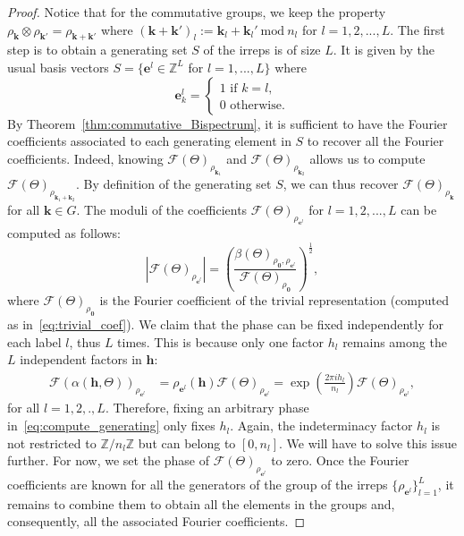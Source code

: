 \documentclass{article}
\theoremstyle{plain}
\theoremstyle{definition}
\theoremstyle{remark}
\newcommand{\kbf}{\mathbf{k}}
\newcommand{\ebf}{\mathbf{e}}
\begin{document}
\begin{proof}
Notice that for the commutative groups, we keep the property $\rho_{\kbf}\otimes\rho_{\kbf'}=\rho_{\kbf+\kbf'}$ where $(\kbf+\kbf')_l := \kbf_l+\kbf_l'\ \mathrm{mod} \ n_l$ for $l=1,2,...,L$. The first step is to obtain a generating set $S$ of the irreps is of size $L$. It is given by the usual basis vectors $S=\{\ebf^l\in \mathbb{Z}^L$ for $l=1,...,L\}$ where
\begin{equation*}
    \ebf^l_k=\begin{cases}
        1 \text{ if } k=l,\\
        0 \text{ otherwise.}
    \end{cases}
\end{equation*}
By Theorem~\ref{thm:commutative_Bispectrum}, it is sufficient to have the Fourier coefficients associated to each generating element in $S$ to recover all the Fourier coefficients. Indeed, knowing $\mathcal{F}(\Theta)_{\rho_{\kbf_1}}$ and $\mathcal{F}(\Theta)_{\rho_{\kbf_2}}$ allows us to compute $\mathcal{F}(\Theta)_{\rho_{\kbf_1+\kbf_2}}$. By definition of the generating set $S$, we can thus recover $\mathcal{F}(\Theta)_{\rho_{\kbf}}$ for all $\kbf \in G$. The moduli of the coefficients $\mathcal{F}(\Theta)_{\rho_{\ebf^l}}$ for $l=1,2,...,L$ can be computed as follows:
\begin{equation}\label{eq:compute_generating}
    |\mathcal{F}(\Theta)_{\rho_{\ebf^l}}| =\left(\frac{\beta(\Theta)_{\rho_\mathbf{0},\rho_{\ebf^l}}}{\mathcal{F}(\Theta)_{\rho_\mathbf{0}}}\right)^\frac{1}{2},
\end{equation}
where $\mathcal{F}(\Theta)_{\rho_\mathbf{0}}$ is the Fourier coefficient of the trivial representation (computed as in~\eqref{eq:trivial_coef}). We claim that the phase can be fixed independently for each label $l$, thus $L$ times. This is because only one factor $h_l$ remains among the $L$ independent factors in $\mathbf{h}$:
\begin{align*}
    \mathcal{F}(\alpha(\mathbf{h},\Theta))_{\rho_{\ebf^l}} &= \rho_{\ebf^l}(\mathbf{h})\mathcal{F}(\Theta)_{\rho_{\ebf^l}}=\exp\left(\frac{2\pi i h_l}{n_l}\right)\mathcal{F}(\Theta)_{\rho_{\ebf^l}},
\end{align*}
for all $l=1,2,.,L$. Therefore, fixing an arbitrary phase in~\eqref{eq:compute_generating} only fixes $h_l$. Again, the indeterminacy factor $h_l$ is not restricted to $\mathbb{Z}/n_l\mathbb{Z}$ but can belong to $[0,n_l]$. We will have to solve this issue further. For now, we set the phase of $\mathcal{F}(\Theta)_{\rho_{\ebf^l}}$ to zero. Once the Fourier coefficients are known for all the generators of the group of the irreps $\{\rho_{\ebf^l}\}_{l=1}^L$, it remains to combine them to obtain all the elements in the groups and, consequently, all the associated Fourier coefficients.


\end{proof}
\end{document}
